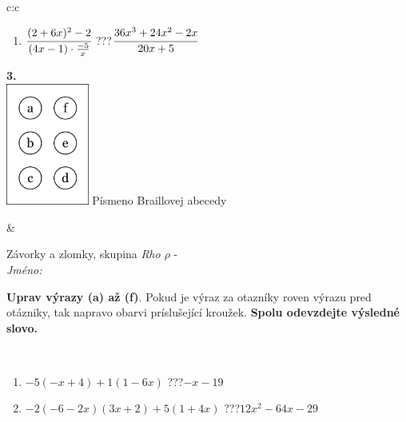 \documentclass[10pt]{report}
\begin{document}
\begin{tabular}{c:c}
\begin{minipage}[c][104.5mm][t]{0.5\linewidth}
\begin{center}
\begin{minipage}{0.79\linewidth}
\begin{center}
\begin{varwidth}{\linewidth}
\begin{enumerate}
\item $\cfrac{(2+6x)^2-2}{(4x-1)\cdot\frac{-5}{x}}$\quad \dotfill\; ???\;\dotfill \quad $\cfrac{36x^3+24x^2-2x}{20x+5}$
\end{enumerate}
\end{varwidth}
\end{center}
\end{minipage}
\begin{minipage}{0.20\linewidth}
\begin{center}
{\Huge\bfseries 3.} \\[2mm]
\includegraphics[height=40mm]{../images/braille.png}
{\small Písmeno Braillovej abecedy}
\end{center}
\end{minipage}
\end{center}
\end{minipage}
&
\begin{minipage}[c][104.5mm][t]{0.5\linewidth}
\begin{center}
\vspace{7mm}
{\huge Závorky a zlomky, skupina \textit{Rho $\rho$} -}\\[5mm]
\textit{Jméno:}\phantom{xxxxxxxxxxxxxxxxxxxxxxxxxxxxxxxxxxxxxxxxxxxxxxxxxxxxxxxxxxxxxxxxx}\\[5mm]
\begin{minipage}{0.95\linewidth}
\begin{center}
\textbf{Uprav výrazy (a) až (f)}. Pokud je výraz za otazníky roven výrazu pred otázniky, tak napravo obarvi príslušející kroužek. \textbf{Spolu odevzdejte výsledné slovo.}
\end{center}
\end{minipage}
\\[1mm]
\begin{minipage}{0.79\linewidth}
\begin{center}
\begin{varwidth}{\linewidth}
\begin{enumerate}
\normalsize
\item $-5(-x+4)+1(1-6x)$\quad \dotfill\; ???\;\dotfill \quad $-x-19$
\item $-2(-6-2x)(3x+2)+5(1+4x)$\quad \dotfill\; ???\;\dotfill \quad $12x^2-64x-29$

\end{enumerate}
\end{varwidth}
\end{center}
\end{minipage}
\end{center}
\end{minipage}
\end{tabular}
\end{document}
